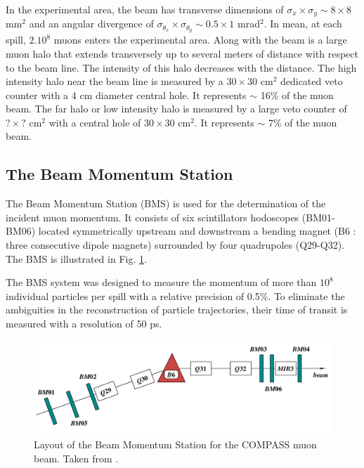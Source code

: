 In the experimental area, the beam has transverse dimensions of $\sigma_x \times \sigma_y \sim 8 \times 8 $ mm$^2$ and an angular divergence of $\sigma_{\theta_x} \times \sigma_{\theta_y} \sim 0.5 \times 1 $ mrad$^2$. In mean, at each spill, $2.10^8$ muons enters the experimental area. Along with the beam is a large muon halo that extends transversely up to several meters of distance with respect to the beam line. The intensity of this halo decreases with the distance. The high intensity halo near the beam line is measured by a $30 \times 30$ cm$^2$ dedicated veto counter with a 4 cm diameter central hole. It represents $\sim$ 16\% of the muon beam. The far halo or low intensity halo is measured by a large veto counter of $? \times ?$ cm$^2$ with a central hole of $30 \times 30$ cm$^2$. It represents $\sim$ 7\% of the muon beam.

\subsection{The Beam Momentum Station}

The Beam Momentum Station (BMS) is used for the determination of the incident muon momentum. It consists of six scintillators hodoscopes (BM01-BM06) located symmetrically upstream and downstream a bending magnet (B6 : three consecutive dipole magnets) surrounded by four quadrupoles (Q29-Q32). The BMS is illustrated in Fig. \ref{pic:BMS}.

The BMS system was designed to measure the momentum of more than $10^8$ individual particles per spill with a relative precision of 0.5\%. To eliminate the ambiguities in the reconstruction of particle trajectories, their time of transit is measured with a resolution of 50 ps.

\begin{figure}[!h]
  \centering
	\includegraphics[scale=0.5]{./gfx/BMS.png}
	\caption{Layout of the Beam Momentum Station for the COMPASS muon beam. Taken from \cite{NIM}.}
	\label{pic:BMS}
\end{figure}


